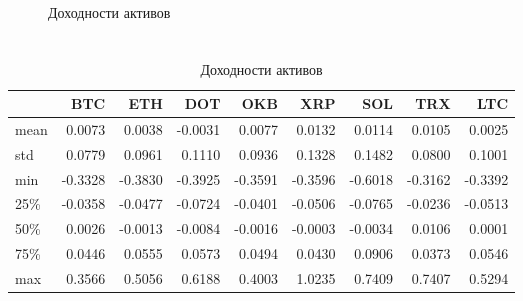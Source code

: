 \documentclass{beamer}
\begin{document}
\begin{frame}
\begin{columns}
\begin{column}{0.5\textwidth}
\begin{figure}
                \caption{Доходности активов}
                \label{fig:returns}
            \end{figure}
        \end{column}
    \end{columns}
\end{frame}

\begin{frame}
    \frametitle{}
    \begin{table}[h]
        \caption{Доходности активов}
        \setlength{\tabcolsep}{3pt}
        \begin{tabularx}{\textwidth}{lrrrrrrrr}
            \toprule
            & BTC & ETH & DOT & OKB & XRP & SOL & TRX & LTC \\
            \midrule
            mean & 0.0073 & 0.0038 & -0.0031 & 0.0077 & 0.0132 & 0.0114 & 0.0105 & 0.0025 \\
            std & 0.0779 & 0.0961 & 0.1110 & 0.0936 & 0.1328 & 0.1482 & 0.0800 & 0.1001 \\
            min & -0.3328 & -0.3830 & -0.3925 & -0.3591 & -0.3596 & -0.6018 & -0.3162 & -0.3392 \\
            25\% & -0.0358 & -0.0477 & -0.0724 & -0.0401 & -0.0506 & -0.0765 & -0.0236 & -0.0513 \\
            50\% & 0.0026 & -0.0013 & -0.0084 & -0.0016 & -0.0003 & -0.0034 & 0.0106 & 0.0001 \\
            75\% & 0.0446 & 0.0555 & 0.0573 & 0.0494 & 0.0430 & 0.0906 & 0.0373 & 0.0546 \\
            max & 0.3566 & 0.5056 & 0.6188 & 0.4003 & 1.0235 & 0.7409 & 0.7407 & 0.5294 \\
            \bottomrule
        \end{tabularx}
        \label{tab:returns_describe}
    \end{table}
\end{frame}

\end{document}
